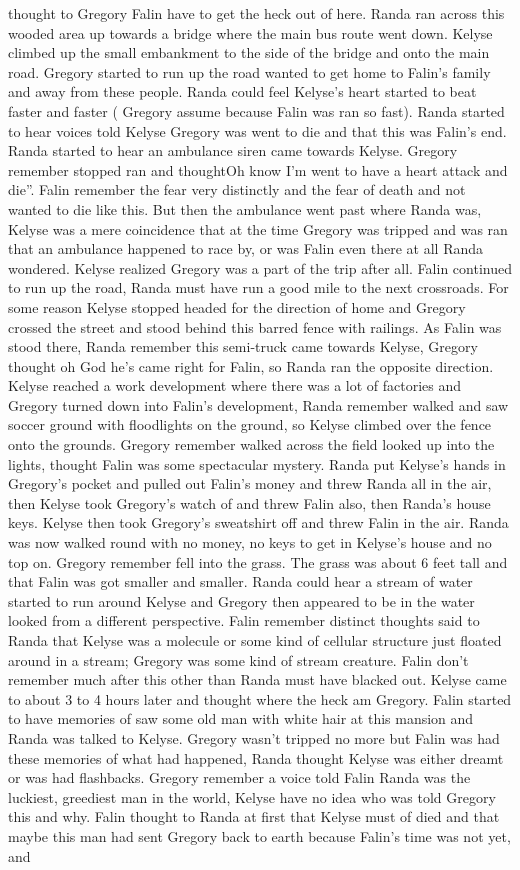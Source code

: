 \documentclass[12pt]{book}
\begin{document}
thought to Gregory Falin have to get the heck out of here. Randa ran across this wooded area up towards a bridge where the main bus route went down. Kelyse climbed up the small embankment to the side of the bridge and onto the main road. Gregory started to run up the road wanted to get home to Falin's family and away from these people. Randa could feel Kelyse's heart started to beat faster and faster ( Gregory assume because Falin was ran so fast). Randa started to hear voices told Kelyse Gregory was went to die and that this was Falin's end. Randa started to hear an ambulance siren came towards Kelyse. Gregory remember stopped ran and thoughtOh know I'm went to have a heart attack and die''. Falin remember the fear very distinctly and the fear of death and not wanted to die like this. But then the ambulance went past where Randa was, Kelyse was a mere coincidence that at the time Gregory was tripped and was ran that an ambulance happened to race by, or was Falin even there at all Randa wondered. Kelyse realized Gregory was a part of the trip after all. Falin continued to run up the road, Randa must have run a good mile to the next crossroads. For some reason Kelyse stopped headed for the direction of home and Gregory crossed the street and stood behind this barred fence with railings. As Falin was stood there, Randa remember this semi-truck came towards Kelyse, Gregory thought oh God he's came right for Falin, so Randa ran the opposite direction. Kelyse reached a work development where there was a lot of factories and Gregory turned down into Falin's development, Randa remember walked and saw soccer ground with floodlights on the ground, so Kelyse climbed over the fence onto the grounds. Gregory remember walked across the field looked up into the lights, thought Falin was some spectacular mystery. Randa put Kelyse's hands in Gregory's pocket and pulled out Falin's money and threw Randa all in the air, then Kelyse took Gregory's watch of and threw Falin also, then Randa's house keys. Kelyse then took Gregory's sweatshirt off and threw Falin in the air. Randa was now walked round with no money, no keys to get in Kelyse's house and no top on. Gregory remember fell into the grass. The grass was about 6 feet tall and that Falin was got smaller and smaller. Randa could hear a stream of water started to run around Kelyse and Gregory then appeared to be in the water looked from a different perspective. Falin remember distinct thoughts said to Randa that Kelyse was a molecule or some kind of cellular structure just floated around in a stream; Gregory was some kind of stream creature. Falin don't remember much after this other than Randa must have blacked out. Kelyse came to about 3 to 4 hours later and thought where the heck am Gregory. Falin started to have memories of saw some old man with white hair at this mansion and Randa was talked to Kelyse. Gregory wasn't tripped no more but Falin was had these memories of what had happened, Randa thought Kelyse was either dreamt or was had flashbacks. Gregory remember a voice told Falin Randa was the luckiest, greediest man in the world, Kelyse have no idea who was told Gregory this and why. Falin thought to Randa at first that Kelyse must of died and that maybe this man had sent Gregory back to earth because Falin's time was not yet, and 
\end{document}
